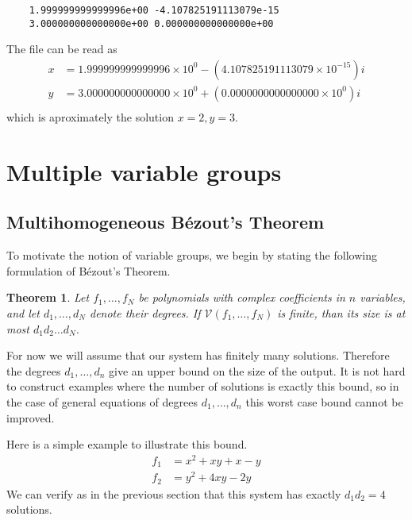 \documentclass[12pt]{article}
\newtheorem{theorem}{Theorem}[section]
\theoremstyle{definition}
\begin{document}
\begin{leftbar}
\vspace{-10pt} 
\begin{verbatim}
    1.999999999999996e+00 -4.107825191113079e-15
    3.000000000000000e+00 0.000000000000000e+00
\end{verbatim}\vspace{-10pt} 
\end{leftbar}

\noindent The file can be read as
\begin{align*}
    x &= 1.999999999999996 \times 10^0 - (4.107825191113079 \times 
    10^{-15})i\\
    y &= 3.000000000000000 \times 10^0 + (0.0000000000000000 \times 
    10^{0})i\\
\end{align*}
which is aproximately the solution $x = 2, y = 3$.


\section{Multiple variable groups}
\subsection{Multihomogeneous B\'{e}zout's Theorem}
To motivate the notion of variable groups, we begin by stating the 
following formulation of B\'{e}zout's Theorem.

\begin{theorem}
Let $f_1, \ldots, f_N$ be polynomials with complex coefficients in $n$ 
variables, and let $d_1, \ldots, d_N$ denote their degrees. If 
$\mathcal{V}(f_1, \ldots, f_N)$ is finite, than its size is at most 
$d_1d_2 \ldots d_N$. 
\end{theorem}

For now we will assume that our system has finitely many solutions.
Therefore the degrees $d_1, \ldots, d_n$ give an upper bound on the size 
of the output. It is not hard to construct examples where the number of 
solutions is exactly this bound, so in the case of general equations of 
degrees $d_1, \ldots, d_n$ this worst case bound cannot be improved.

Here is a simple example to illustrate this bound.
\begin{align*}
    f_1 &= x^2 + xy + x - y\\
    f_2 &= y^2 + 4xy - 2y
\end{align*}
We can verify as in the previous section that this system has exactly 
$d_1d_2 = 4$ solutions.
\end{document}
